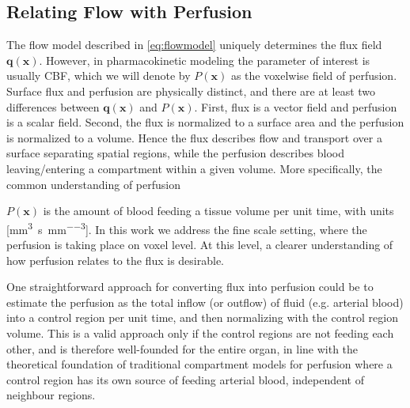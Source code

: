\documentclass[journal,twocolumn]{IEEEtran}
\newcommand{\Perf}{P}
\newcommand{\vq}{\mathbf{q}}
\newcommand{\vx}{\mathbf{x}}
\newcommand{\siQmm}{\milli\meter\cubed\per\second\per\milli\meter\cubed}
\begin{document}

	\subsection{Relating Flow with Perfusion}\label{sec:flux2perf}
	The flow model described in \eqref{eq:flowmodel} uniquely determines the flux field $\vq(\vx)$. 
	However, in pharmacokinetic modeling the parameter of interest is usually CBF, which we will denote by $\Perf (\vx)$ as the voxelwise field of perfusion. Surface flux and perfusion are physically distinct, and there are at least two differences between $\vq(\vx)$ and $\Perf (\vx)$. 
	First, flux is a vector field and perfusion is a scalar field. Second, the flux is normalized to a surface area and the perfusion is normalized to a volume. 
	Hence the flux describes flow and transport over a surface separating spatial regions, while the perfusion describes blood leaving/entering a compartment within a given volume. 	
More specifically, the common understanding of perfusion
	 
	 $\Perf (\vx)$ is the amount of blood feeding a tissue volume per unit time, with units [\si{\siQmm}]. 
	 In this work we address the  fine scale setting, where the perfusion is taking place on voxel level. At this level, a clearer understanding of how perfusion relates to the flux is desirable.  

	One straightforward approach for converting flux into perfusion could be to estimate the perfusion as the total inflow (or outflow) of fluid (e.g. arterial blood) into a control region per unit time, and then normalizing with the control region volume. 
	This is a valid approach only if the control regions are not feeding each other, and is therefore well-founded for the entire organ,
	in line with the theoretical foundation of traditional compartment models for perfusion where a control region has its own source of feeding arterial blood, independent of neighbour regions. 
\end{document}
